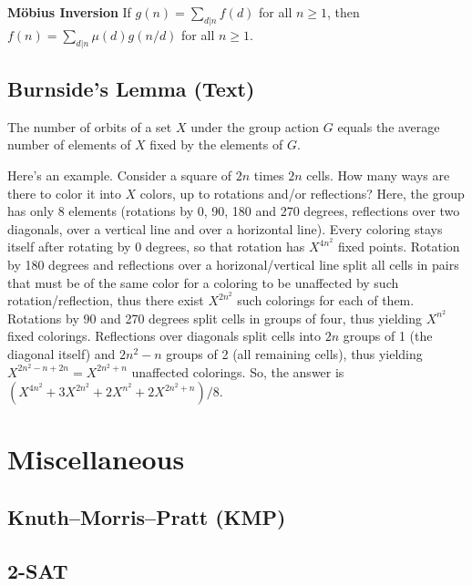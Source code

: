 \documentclass[9pt]{extarticle}
\begin{document}
\begin{multicols*}{3}
\textbf{M\"obius Inversion}
If $g(n) = \sum_{d|n} f(d)$ for all $n \ge 1$, then
$f(n) = \sum_{d|n} \mu(d)g(n/d)$ for all $n \ge 1$.

\subsection{Burnside's Lemma (Text)} %
The number of orbits of a set $X$ under the group action $G$ equals the average
number of elements of $X$ fixed by the elements of $G$.

Here's an example. Consider a square of $2n$ times $2n$ cells. How many ways
are there to color it into $X$ colors, up to rotations and/or reflections?
Here, the group has only 8 elements (rotations by 0, 90, 180 and 270 degrees,
reflections over two diagonals, over a vertical line and over a horizontal
line). Every coloring stays itself after rotating by 0 degrees, so that
rotation has $X^{4n^2}$ fixed points. Rotation by 180 degrees and reflections
over a horizonal/vertical line split all cells in pairs that must be of the
same color for a coloring to be unaffected by such rotation/reflection, thus
there exist $X^{2n^2}$ such colorings for each of them. Rotations by 90 and 270
degrees split cells in groups of four, thus yielding $X^{n^2}$ fixed colorings.
Reflections over diagonals split cells into $2n$ groups of 1 (the diagonal
itself) and $2n^2-n$ groups of 2 (all remaining cells), thus yielding
$X^{2n^2-n+2n}=X^{2n^2+n}$ unaffected colorings.  So, the answer is
$(X^{4n^2}+3X^{2n^2}+2X^{n^2}+2X^{2n^2+n})/8$.

\section{Miscellaneous}

\subsection{Knuth--Morris--Pratt (KMP)} %


\subsection{2-SAT} %



\end{multicols*}
\end{document}
